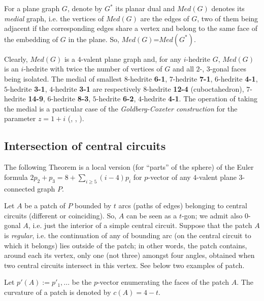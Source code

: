 \documentclass[12pt]{article}
\begin{document}
For a plane graph $G$, denote by $G^*$ its planar dual and {\em $Med(G)$} 
denotes its {\em medial} graph, i.e. the vertices of $Med(G)$ are the edges of 
$G$, two of them being adjacent if the corresponding edges share a vertex and 
belong to the same face of the embedding of $G$ in the plane. 
So, $Med(G)$=$Med(G^*)$.

Clearly, $Med(G)$ is a $4$-valent plane graph and, for any $i$-hedrite $G$,
$Med(G)$ is an $i$-hedrite with twice the number of vertices of $G$ and
all $2$-, $3$-gonal faces being isolated. The medial of smallest
$8$-hedrite {\bf 6-1}, $7$-hedrite {\bf 7-1}, $6$-hedrite {\bf 4-1},
$5$-hedrite {\bf 3-1}, $4$-hedrite {\bf 3-1} are respectively $8$-hedrite
{\bf 12-4} (cuboctahedron), $7$-hedrite {\bf 14-9}, $6$-hedrite {\bf 8-3},
$5$-hedrite {\bf 6-2}, $4$-hedrite {\bf 4-1}.
The operation of taking the medial is a particular case of the {\em Goldberg-Coxeter construction} for the parameter $z=1+i$ (\cite{Gold37}, \cite{Cox71}, \cite{DD03}).





\subsection{Intersection of central circuits}

The following Theorem is a local version (for ``parts'' of the sphere) of
the Euler formula
$2p_2+p_3=8+ \sum_{i\geq 5} (i-4)p_i$ for $p$-vector of any $4$-valent 
plane $3$-connected graph $P$.

Let $A$ be a patch of $P$ bounded by $t$ arcs (paths of edges) belonging to 
central circuits (different or coinciding). So, $A$ can be seen as a 
$t$-gon; we admit also $0$-gonal $A$, i.e.
just the interior of a simple central circuit. Suppose that the patch $A$ is
{\em regular}, i.e.
the continuation of any of bounding arc (on the central circuit to which it
belongs) lies outside of the patch; in other words, the patch
contains, around each its vertex, only one (not three) amongst four angles, 
obtained when two central circuits intersect in this vertex.  See below two 
examples of patch.

\begin{center}
\epsfxsize=60mm
\end{center}

Let $p'(A):=p'_1,...$ be the $p$-vector enumerating the faces of the patch $A$. The curvature of a patch is denoted by $c(A)=4-t$.
\end{document}

